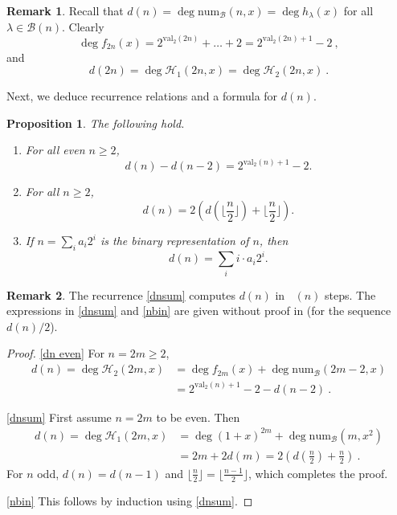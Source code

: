 \documentclass[reqno]{amsart}
\def\num{\mathrm{num}}
\def\val{\mathrm{val}}
\def\B{\mathcal{B}}
\DeclareMathOperator{\lb}{\log_2}
\newtheorem{proposition}[theorem]{Proposition}
\theoremstyle{definition}
\newtheorem{remark}{Remark}
\begin{document}
\begin{remark} Recall that $d(n)=\deg \num_{\mathcal B}(n,x)=\deg h_\lambda(x)$ for all $\lambda\in \mathcal B(n)$.
Clearly
\[\deg f_{2n}(x)=2^{\val_2(2n)}+\ldots+2=2^{\val_2(2n)+1}-2\:,\]
and 
\[d(2n)=\deg\mathcal H_1(2n,x)=\deg\mathcal H_2(2n,x)\:.\]
\end{remark}
 Next, we deduce recurrence relations  and a formula for $d(n)$.
\begin{proposition} \label{prop:d(n)} The following hold.
    \begin{enumerate}[label=(\alph*)]
    \item\label{dn even} For all even $n\geq 2$,
    \[d(n)-d(n-2)=2^{\val_2(n)+1}-2.\]
    \item\label{dnsum} For all $n\geq 2$,
        \[d(n)=2\left(d(\lfloor\frac{n}{2}\rfloor)+\lfloor\frac{n}{2}\rfloor\right).\]
    \item\label{nbin}  If $n=\sum_i a_i2^i$ is the binary representation of $n$, then 
    \[d(n)=\sum_i i\cdot a_i2^i.\]
    \end{enumerate}
\end{proposition}
\begin{remark}
   The recurrence \ref{dnsum} computes $d(n)$ in $\lb(n)$ steps. The expressions in \ref{dnsum} and \ref{nbin} are  given without proof in \cite[A136013]{OEIS}   (for the sequence $d(n)/2$). 
\end{remark}

\begin{proof}
    \ref{dn even}  For  $n=2m\geq 2$, 
    \begin{align*}
       d(n)=\deg \mathcal H_2(2m,x)
       &=\deg f_{2m}(x)+\deg\num_{\B}(2m-2,x)\\
       &=2^{\val_2(n)+1}-2-d(n-2)\:.
    \end{align*}
    
    \ref{dnsum} First assume $n=2m$ to be even.    
    Then
    \begin{align*}
        d(n)=\deg\mathcal H_1(2m,x)
        &= \deg (1+x)^{2m}+\deg \num_{\B}(m,x^2)\\
        &= 2m +2d(m) =2\left(d(\frac{n}{2})+\frac{n}{2}\right)\:.
    \end{align*}
    For $n$ odd,  $d(n)=d(n-1)$ and $\lfloor\frac{n}{2}\rfloor=\lfloor\frac{n-1}{2}\rfloor$, which completes the proof.
    
    \ref{nbin} This follows by induction using  \ref{dnsum}. 
\end{proof}
\end{document}
